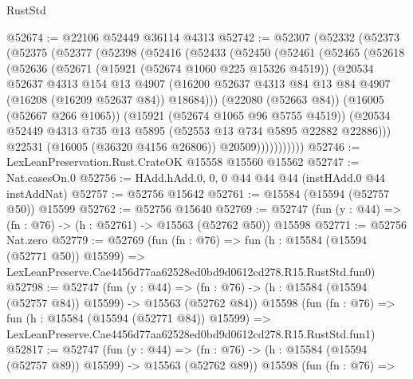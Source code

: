 \begin{lexlean}{RustStd}
\begin{coremodule}
@52674 := @22106 @52449 @36114 @4313
@52742 := @52307
    (@52332
      (@52373
        (@52375
          (@52377
            (@52398
              (@52416
                (@52433
                  (@52450
                    (@52461
                      (@52465
                        (@52618
                          (@52636
                            (@52671
                              (@15921 (@52674 @1060 @225 @15326 @4519))
                              (@20534
                                @52637
                                @4313
                                @154
                                @13
                                @4907
                                (@16200
                                  @52637
                                  @4313
                                  @84
                                  @13
                                  @84
                                  @4907
                                  (@16208 (@16209 @52637 @84))
                                  @18684)))
                            (@22080 (@52663 @84))
                            (@16005 (@52667 @266 @1065))
                            (@15921 (@52674 @1065 @96 @5755 @4519))
                            (@20534
                              @52449
                              @4313
                              @735
                              @13
                              @5895
                              (@52553 @13 @734 @5895 @22882 @22886)))
                          @22531
                          (@16005 (@36320 @4156 @26806))
                          @20509)))))))))))
@52746 := LexLeanPreservation.Rust.CrateOK @15558 @15560 @15562
@52747 := Nat.casesOn.{0}
@52756 := HAdd.hAdd.{0, 0, 0} @44 @44 @44 (instHAdd.{0} @44 instAddNat)
@52757 := @52756 @15642
@52761 := @15584 (@15594 (@52757 @50)) @15599
@52762 := @52756 @15640
@52769 := @52747 (fun (y : @44) => (fn : @76) -> (h : @52761) -> @15563 (@52762 @50)) @15598
@52771 := @52756 Nat.zero
@52779 := @52769
    (fun (fn : @76) =>
    fun (h : @15584 (@15594 (@52771 @50)) @15599) =>
    LexLeanPreserve.Cae4456d77aa62528ed0bd9d0612cd278.R15.RustStd.fun0)
@52798 := @52747
    (fun (y : @44) =>
    (fn : @76) -> (h : @15584 (@15594 (@52757 @84)) @15599) -> @15563 (@52762 @84))
    @15598
    (fun (fn : @76) =>
    fun (h : @15584 (@15594 (@52771 @84)) @15599) =>
    LexLeanPreserve.Cae4456d77aa62528ed0bd9d0612cd278.R15.RustStd.fun1)
@52817 := @52747
    (fun (y : @44) =>
    (fn : @76) -> (h : @15584 (@15594 (@52757 @89)) @15599) -> @15563 (@52762 @89))
    @15598
    (fun (fn : @76) =>

\end{coremodule}
\end{lexlean}
